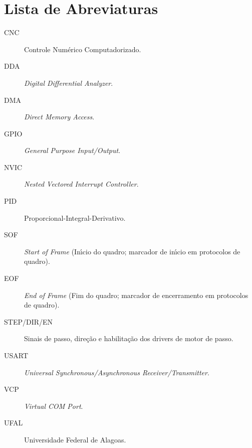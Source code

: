 \chapter*{Lista de Abreviaturas}

\begin{description}
  \item[CNC] \quad Controle Numérico Computadorizado.
  \item[DDA] \quad \emph{Digital Differential Analyzer}.
  \item[DMA] \quad \emph{Direct Memory Access}.
  \item[GPIO] \quad \emph{General Purpose Input/Output}.
  \item[NVIC] \quad \emph{Nested Vectored Interrupt Controller}.
  \item[PID] \quad Proporcional-Integral-Derivativo.
  \item[SOF] \quad \emph{Start of Frame} (In\'{\i}cio do quadro; marcador de in\'{\i}cio em protocolos de quadro).
  \item[EOF] \quad \emph{End of Frame} (Fim do quadro; marcador de encerramento em protocolos de quadro).
  \item[STEP/DIR/EN] \quad Sinais de passo, direção e habilitação dos drivers de motor de passo.
  \item[USART] \quad \emph{Universal Synchronous/Asynchronous Receiver/Transmitter}.
  \item[VCP] \quad \emph{Virtual COM Port}.
  \item[UFAL] \quad Universidade Federal de Alagoas.
\end{description}

